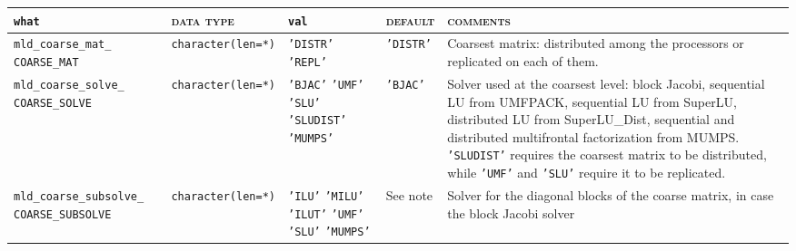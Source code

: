 \bsideways
\begin{center}
\begin{tabular}{|p{3.5cm}|l|p{3.2cm}|l|p{5cm}|}
\hline
\verb|what|              & \textsc{data type}        &  \verb|val|      &  \textsc{default}  &
\textsc{comments} \\ \hline
\verb|mld_coarse_mat_|  \break \verb|COARSE_MAT|  & \verb|character(len=*)|
                         & \texttt{'DISTR'} \hspace{2.5cm} \texttt{'REPL'}
                         & \texttt{'DISTR'}
                         & Coarsest matrix: distributed among the processors or
                           replicated on each of them. \\ \hline
\verb|mld_coarse_solve_| \break \verb|COARSE_SOLVE| & \verb|character(len=*)|
                         & \texttt{'BJAC'} \hspace{2.5cm} \texttt{'UMF'} \hspace{2.5cm}
                           \texttt{'SLU'} \hspace{2.5cm} \texttt{'SLUDIST'} \hspace{2.5cm} \texttt{'MUMPS'}
                         & \texttt{'BJAC'}
                         & Solver used at the coarsest level: block Jacobi, sequential
                           LU from UMFPACK, sequential LU from SuperLU, 
                           distributed LU from SuperLU\_Dist, sequential and distributed 
			   multifrontal factorization from MUMPS.
                           \texttt{'SLUDIST'} requires the coarsest 
                           matrix to be distributed, while \texttt{'UMF'} and
                           \texttt{'SLU'} require it to be replicated.  \\ \hline
\verb|mld_coarse_subsolve_| \break \verb|COARSE_SUBSOLVE| & \verb|character(len=*)|
                         & \texttt{'ILU'} \hspace{2.5cm} \texttt{'MILU'}
                           \hspace{2.5cm} \texttt{'ILUT'}
                           \hspace{2.5cm} \texttt{'UMF'} \hspace{2.5cm} \texttt{'SLU'} \hspace{2.5cm} \texttt{'MUMPS'}
                         & See note
                         & Solver for the diagonal blocks of the coarse matrix,
                           in case the block Jacobi solver

\end{tabular}
\end{center}
